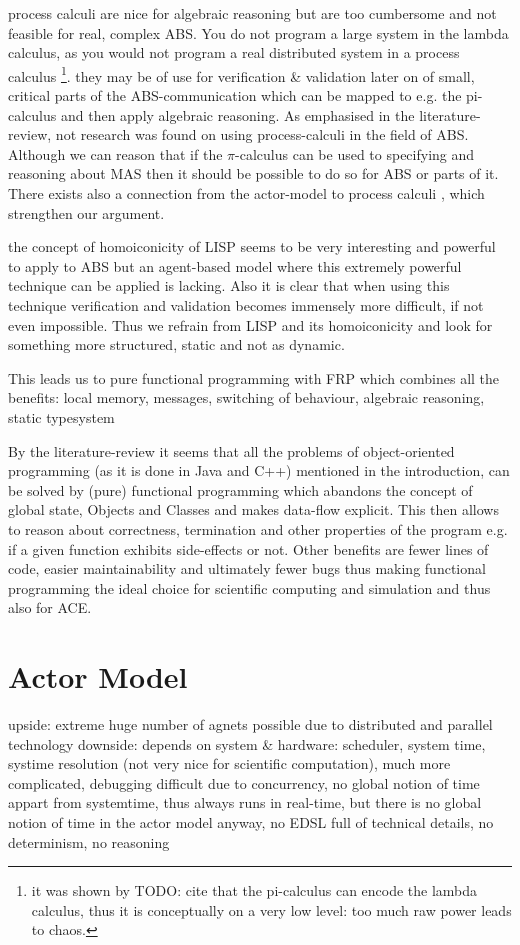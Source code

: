 process calculi are nice for algebraic reasoning but are too cumbersome and not feasible for real, complex ABS. You do not program a large system in the lambda calculus, as you would not program a real distributed system in a process calculus \footnote{it was shown by TODO: cite that the pi-calculus can encode the lambda calculus, thus it is conceptually on a very low level: too much raw power leads to chaos.}. they may be of use for verification \& validation later on of small, critical parts of the ABS-communication which can be mapped to e.g. the pi-calculus and then apply algebraic reasoning.
As emphasised in the literature-review, not research was found on using process-calculi in the field of ABS. Although we can reason that if the $\pi$-calculus can be used to specifying and reasoning about MAS then it should be possible to do so for ABS or parts of it. There exists also a connection from the actor-model to process calculi \cite{agha_foundation_1997}, which strengthen our argument. 

the concept of homoiconicity of LISP seems to be very interesting and powerful to apply to ABS but an agent-based model where this extremely powerful technique can be applied is lacking. Also it is clear that when using this technique verification and validation becomes immensely more difficult, if not even impossible. Thus we refrain from LISP and its homoiconicity and look for something more structured, static and not as dynamic.

This leads us to pure functional programming with FRP which combines all the benefits: local memory, messages, switching of behaviour, algebraic reasoning, static typesystem

By the literature-review it seems that all the problems of object-oriented programming (as it is done in Java and C++) mentioned in the introduction, can be solved by (pure) functional programming which abandons the concept of global state, Objects and Classes and makes data-flow explicit. This then allows to reason about correctness, termination and other properties of the program e.g. if a given function exhibits side-effects or not. Other benefits are fewer lines of code, easier maintainability and ultimately fewer bugs thus making functional programming the ideal choice for scientific computing and simulation and thus also for ACE.

\section{Actor Model}
upside: extreme huge number of agnets possible due to distributed and parallel technology 
downside: depends on system \& hardware: scheduler, system time, systime resolution (not very nice for scientific computation), much more complicated, debugging difficult due to concurrency, no global notion of time appart from systemtime, thus always runs in real-time, but there is no global notion of time in the actor model anyway, no EDSL full of technical details, no determinism, no reasoning

